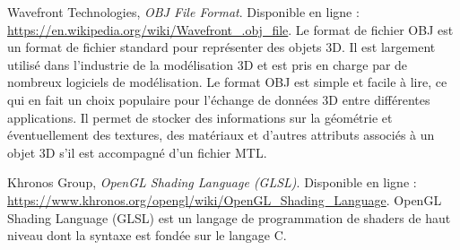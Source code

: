 \begin{thebibliography}{9}
    Wavefront Technologies, \textit{OBJ File Format}.
    Disponible en ligne : \url{https://en.wikipedia.org/wiki/Wavefront_.obj_file}.
    Le format de fichier OBJ est un format de fichier standard pour représenter des objets 3D.
    Il est largement utilisé dans l'industrie de la modélisation 3D et est pris en charge par de nombreux logiciels de modélisation.
    Le format OBJ est simple et facile à lire, ce qui en fait un choix populaire pour l'échange de données 3D entre différentes applications.
    Il permet de stocker des informations sur la géométrie et éventuellement des textures, des matériaux et d'autres attributs associés à un objet 3D s'il est
    accompagné d'un fichier MTL.

    Khronos Group, \textit{OpenGL Shading Language (GLSL)}.
    Disponible en ligne : \url{https://www.khronos.org/opengl/wiki/OpenGL_Shading_Language}.
    OpenGL Shading Language (GLSL) est un langage de
    programmation de shaders de haut niveau dont la syntaxe est fondée sur
    le langage C.
    

\end{thebibliography}